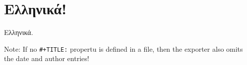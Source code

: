 \documentclass[11pt]{article}
\author{Ioannis Zannos}
\date{\today}
\title{}
\begin{document}
\tableofcontents


\section{Ελληνικά!}
\label{sec:org9f0f40b}

Ελληνικά.

Note: If no \texttt{\#+TITLE:} propertu is defined in a file, then the exporter also omits the date and author entries!
\end{document}
